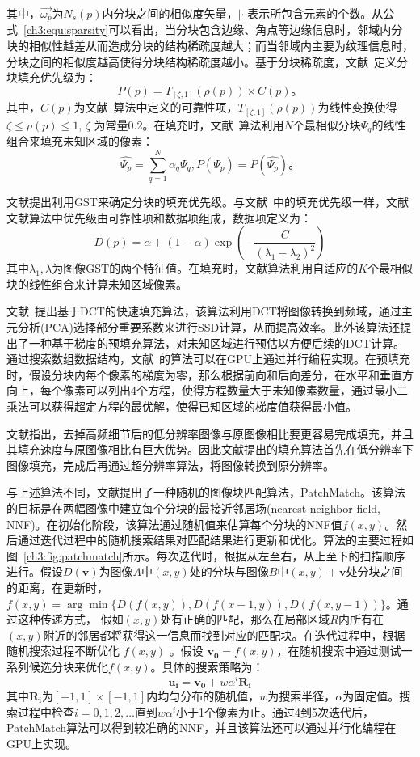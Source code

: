 其中，$\vec{\omega_p}$为$N_s(p)$内分块之间的相似度矢量，$|\cdot|$表示所包含元素的个数。从公式~\ref{ch3:equ:sparsity}可以看出，当分块包含边缘、角点等边缘信息时，邻域内分块的相似性越差从而造成分块的结构稀疏度越大；而当邻域内主要为纹理信息时，分块之间的相似度越高使得分块结构稀疏度越小。基于分块稀疏度，文献~\cite{Xu:2010}定义分块填充优先级为：
$$P(p) = T_{[\zeta,1]}(\rho(p)) \times C(p) 。$$
其中，$C(p)$为文献~算法中定义的可靠性项，$T_{[\zeta,1]}(\rho(p))$为线性变换使得$\zeta \leqslant \rho(p) \leqslant 1$, $\zeta$ 为常量0.2。在填充时，文献~算法利用$N$个最相似分块$\Psi_q$的线性组合来填充未知区域的像素：
$$\hat{\Psi_p}= \sum_{q=1}^{N}{ \alpha_q \Psi_q}, P(\Psi_p) = P(\hat{\Psi_{p}}) 。$$\par
文献提出利用GST来确定分块的填充优先级。与文献~\cite{Criminisi04regionfilling}中的填充优先级一样，文献文献算法中优先级由可靠性项和数据项组成，数据项定义为：
$$ D(p) = \alpha + (1-\alpha)\exp(-\frac{C}{(\lambda_1 - \lambda_2)^2})$$
其中$\lambda_1,\lambda$为图像GST的两个特征值。在填充时，文献算法利用自适应的$K$个最相似块的线性组合来计算未知区域像素。\par
文献~提出基于DCT的快速填充算法，该算法利用DCT将图像转换到频域，通过主元分析(PCA)选择部分重要系数来进行SSD计算，从而提高效率。此外该算法还提出了一种基于梯度的预填充算法，对未知区域进行预估以方便后续的DCT计算。通过搜索数组数据结构，文献~的算法可以在GPU上通过并行编程实现。在预填充时，假设分块内每个像素的梯度为零，那么根据前向和后向差分，在水平和垂直方向上，每个像素可以列出4个方程，使得方程数量大于未知像素数量，通过最小二乘法可以获得超定方程的最优解，使得已知区域的梯度值获得最小值。 \par
文献指出，去掉高频细节后的低分辨率图像与原图像相比要更容易完成填充，并且其填充速度与原图像相比有巨大优势。因此文献提出的填充算法首先在低分辨率下图像填充，完成后再通过超分辨率算法，将图像转换到原分辨率。\par
与上述算法不同，文献提出了一种随机的图像块匹配算法，PatchMatch。该算法的目标是在两幅图像中建立每个分块的最接近邻居场(nearest-neighbor field, NNF)。在初始化阶段，该算法通过随机值来估算每个分块的NNF值$f(x,y)$。然后通过迭代过程中的随机搜索结果对匹配结果进行更新和优化。算法的主要过程如图~\ref{ch3:fig:patchmatch}所示。每次迭代时，根据从左至右，从上至下的扫描顺序进行。假设$D(\textbf{v})$为图像$A$中$(x,y)$处的分块与图像$B$中$(x,y)+ \textbf{v} $处分块之间的距离，在更新时，$f(x,y) = \arg \min\{D(f(x,y)),D(f(x-1,y)),D(f(x,y-1))\}$。通过这种传递方式， 假如$(x,y)$处有正确的匹配，那么在局部区域$R$内所有在$(x,y)$附近的邻居都将获得这一信息而找到对应的匹配块。在迭代过程中，根据随机搜索过程不断优化 $f(x,y)$ 。假设 $ \mathbf{{v_{0}}}= f(x,y)$，在随机搜索中通过测试一系列候选分块来优化$f(x,y)$。具体的搜索策略为：
$$ \mathbf{u_i} = \mathbf{v_0} + w\alpha^{i}\mathbf{R_{i}}$$
其中$\mathbf{R_{i}}$为$[-1,1] \times [-1,1]$内均匀分布的随机值，$w$为搜索半径，$\alpha$为固定值。搜索过程中检查$i=0,1,2,\ldots$直到$w\alpha^i$小于1个像素为止。通过4到5次迭代后，PatchMatch算法可以得到较准确的NNF，并且该算法还可以通过并行化编程在GPU上实现。

